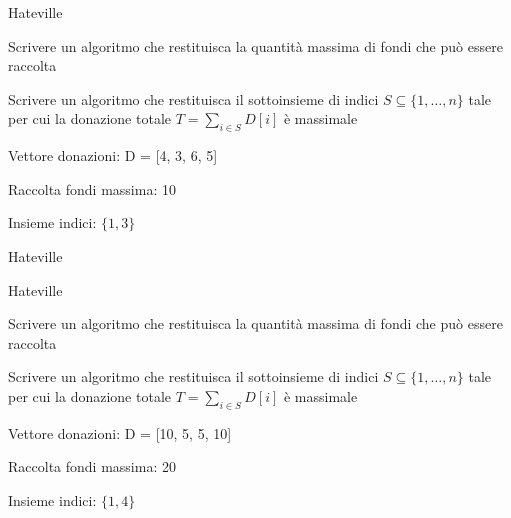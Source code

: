 \begin{frame}{Hateville}

\vspace{-9pt}
\begin{myboxtitle}[Problemi]
\BIL
\item Scrivere un algoritmo che restituisca la quantità massima di
fondi che può essere raccolta
\item Scrivere un algoritmo che restituisca il sottoinsieme di indici 
$S \subseteq \{ 1, \ldots, n \}$ tale per cui la donazione totale
$T = \sum_{i \in S} D[i]$ è massimale
\EIL
\end{myboxtitle}

\begin{myboxtitle}[Esempio]
\BIL
\item Vettore donazioni: \textsf{D = [4, 3, 6, 5]}
\item Raccolta fondi massima: 10
\item Insieme indici: $\{1, 3\}$
\EIL
\end{myboxtitle}

\end{frame}

\begin{frame}{Hateville}

\vspace{-9pt}

\end{frame}

\begin{frame}{Hateville}

\vspace{-9pt}
\begin{myboxtitle}[Problemi]
\BIL
\item Scrivere un algoritmo che restituisca la quantità massima di
fondi che può essere raccolta
\item Scrivere un algoritmo che restituisca il sottoinsieme di indici 
$S \subseteq \{ 1, \ldots, n \}$ tale per cui la donazione totale
$T = \sum_{i \in S} D[i]$ è massimale
\EIL
\end{myboxtitle}

\begin{myboxtitle}
\BIL
\item Vettore donazioni: \textsf{D = [10, 5, 5, 10]}
\item Raccolta fondi massima: 20
\item Insieme indici: $\{1, 4\}$
\EIL
\end{myboxtitle}
\end{frame}


